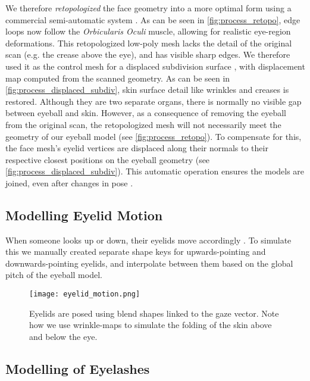 
We therefore \emph{retopologized} the face geometry into a more optimal form using a commercial semi-automatic system \cite{ZRemesher}.
As can be seen in \autoref{fig:process_retopo}, edge loops now follow the \emph{Orbicularis Oculi} muscle, allowing for realistic eye-region deformations.
This retopologized low-poly mesh lacks the detail of the original scan (e.g. the crease above the eye), and has visible sharp edges.
We therefore used it as the control mesh for a displaced subdivision surface \cite{lee2000displaced}, with displacement map computed from the scanned geometry.
As can be seen in \autoref{fig:process_displaced_subdiv}, skin surface detail like wrinkles and creases is restored.
Although they are two separate organs, there is normally no visible gap between eyeball and skin.
However, as a consequence of removing the eyeball from the original scan, the retopologized mesh will not necessarily meet the geometry of our eyeball model (see \autoref{fig:process_retopo}).
To compensate for this, the face mesh's eyelid vertices are displaced along their normals to their respective closest positions on the eyeball geometry (see \autoref{fig:process_displaced_subdiv}).
This automatic operation ensures the models are joined, even after changes in pose \cite{Shrinkwrap}.

\subsection{Modelling Eyelid Motion}

When someone looks up or down, their eyelids move accordingly \cite{liversedge2011oxford}.
To simulate this we manually created separate shape keys for upwards-pointing and downwards-pointing eyelids, and interpolate between them based on the global pitch of the eyeball model.

\begin{figure}
    \texttt{[image: eyelid\_motion.png]}
    \caption{Eyelids are posed using blend shapes linked to the gaze vector. Note how we use wrinkle-maps to simulate the folding of the skin above and below the eye.}
\end{figure}

\subsection{Modelling of Eyelashes}

